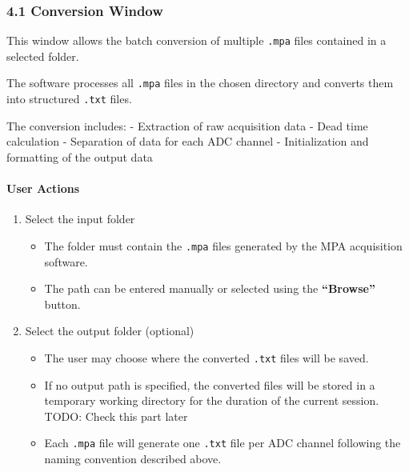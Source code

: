 \hypertarget{conversion-window}{%
\subsubsection{4.1 Conversion Window}\label{conversion-window}}

This window allows the batch conversion of multiple \texttt{.mpa} files
contained in a selected folder.

The software processes all \texttt{.mpa} files in the chosen directory
and converts them into structured \texttt{.txt} files.

The conversion includes: - Extraction of raw acquisition data - Dead
time calculation - Separation of data for each ADC channel -
Initialization and formatting of the output data

\hypertarget{user-actions}{%
\paragraph{User Actions}\label{user-actions}}

\begin{enumerate}
\def\labelenumi{\arabic{enumi}.}
\tightlist
\item
  Select the input folder

  \begin{itemize}
  \tightlist
  \item
    The folder must contain the \texttt{.mpa} files generated by the MPA
    acquisition software.\\
  \item
    The path can be entered manually or selected using the
    \textbf{``Browse''} button.
  \end{itemize}
\item
  Select the output folder (optional)

  \begin{itemize}
  \tightlist
  \item
    The user may choose where the converted \texttt{.txt} files will be
    saved.\\
  \item
    If no output path is specified, the converted files will be stored
    in a temporary working directory for the duration of the current
    session. {TODO: Check this part later}
  \item
    Each \texttt{.mpa} file will generate one \texttt{.txt} file per ADC
    channel following the naming convention described above.
  \end{itemize}
\end{enumerate}

